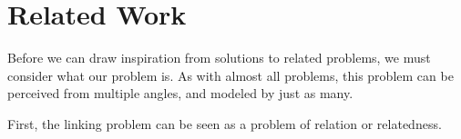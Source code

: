 \section{Related Work}\label{sec:related_work}

Before we can draw inspiration from solutions to related problems, we must consider what our problem is. As with almost all problems, this problem can be perceived from multiple angles, and modeled by just as many.

First, the linking problem can be seen as a problem of relation or relatedness.









